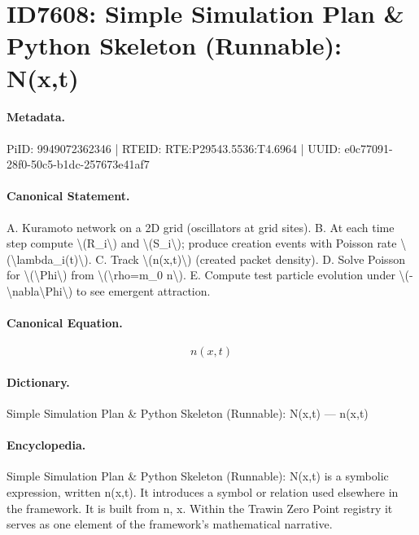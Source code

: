 \section*{ID7608: Simple Simulation Plan \& Python Skeleton (Runnable): N(x,t)}
\paragraph{Metadata.}
PiID: 9949072362346 | RTEID: RTE:P29543.5536:T4.6964 | UUID: e0c77091-28f0-50c5-b1dc-257673e41af7

\paragraph{Canonical Statement.}
A. Kuramoto network on a 2D grid (oscillators at grid sites). B. At each time step compute \textbackslash{}(R\_i\textbackslash{}) and \textbackslash{}(S\_i\textbackslash{}); produce creation events with Poisson rate \textbackslash{}(\textbackslash{}lambda\_i(t)\textbackslash{}). C. Track \textbackslash{}(n(x,t)\textbackslash{}) (created packet density). D. Solve Poisson for \textbackslash{}(\textbackslash{}Phi\textbackslash{}) from \textbackslash{}(\textbackslash{}rho=m\_0 n\textbackslash{}). E. Compute test particle evolution under \textbackslash{}(-\textbackslash{}nabla\textbackslash{}Phi\textbackslash{}) to see emergent attraction.

\paragraph{Canonical Equation.}
\[
n(x,t)
\]

\paragraph{Dictionary.}
Simple Simulation Plan \& Python Skeleton (Runnable): N(x,t) — n(x,t)

\paragraph{Encyclopedia.}
Simple Simulation Plan \& Python Skeleton (Runnable): N(x,t) is a symbolic expression, written n(x,t). It introduces a symbol or relation used elsewhere in the framework. It is built from n, x. Within the Trawin Zero Point registry it serves as one element of the framework's mathematical narrative.
